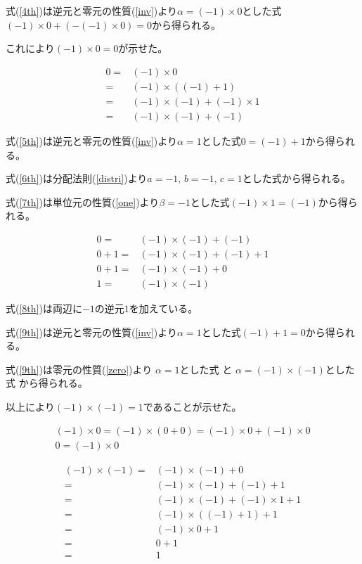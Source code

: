 \documentclass[12pt,b5paper]{ltjsarticle}
\begin{document}
式(\ref{4th})は逆元と零元の性質(\ref{inv})より$\alpha = (-1)\times 0$とした式
$(-1)\times 0 + (-(-1)\times 0) = 0 $から得られる。

これにより$(-1)\times 0 =0$が示せた。

\begin{align}
 0 =& (-1)\times 0\\
 =& (-1)\times ((-1)+1)\label{5th}\\
 =& (-1)\times (-1) + (-1)\times 1\label{6th}\\
 =& (-1)\times (-1) + (-1)\label{7th}
\end{align}

式(\ref{5th})は逆元と零元の性質(\ref{inv})より$\alpha = 1$とした式$0=(-1)+1$から得られる。

式(\ref{6th})は分配法則(\ref{distri})より$a=-1,\, b=-1,\, c=1$とした式から得られる。

式(\ref{7th})は単位元の性質(\ref{one})より$\beta = -1$とした式$(-1)\times 1 = (-1)$から得られる。


\begin{align}
 0 =& (-1)\times (-1) + (-1)\\
 0 + 1 =& (-1)\times (-1) + (-1) +1\label{8th}\\
 0 + 1 =& (-1)\times (-1) + 0\label{9th}\\
 1 =& (-1)\times (-1)\label{10th}
\end{align}

式(\ref{8th})は両辺に$-1$の逆元$1$を加えている。

式(\ref{9th})は逆元と零元の性質(\ref{inv})より$\alpha = 1$とした式$(-1)+1 =0$から得られる。

式(\ref{9th})は零元の性質(\ref{zero})より
$\alpha = 1$とした式%
と
$\alpha = (-1)\times (-1)$とした式%
から得られる。

以上により$(-1)\times (-1)=1$であることが示せた。






\hrulefill

\hrulefill


\begin{gather}
 (-1)\times 0 = (-1)\times (0+0) = (-1)\times 0 + (-1)\times 0\\
 0 = (-1)\times 0
\end{gather}

\begin{align}
 (-1)\times(-1)
 =& (-1)\times(-1) +0\\
 =& (-1)\times(-1) +(-1)+1\\
 =& (-1)\times(-1) +(-1)\times 1+1\\
 =& (-1)\times((-1) + 1)+1\\
 =& (-1)\times 0+1\\
 =& 0+1\\
 =& 1
\end{align}

\hrulefill
\end{document}
